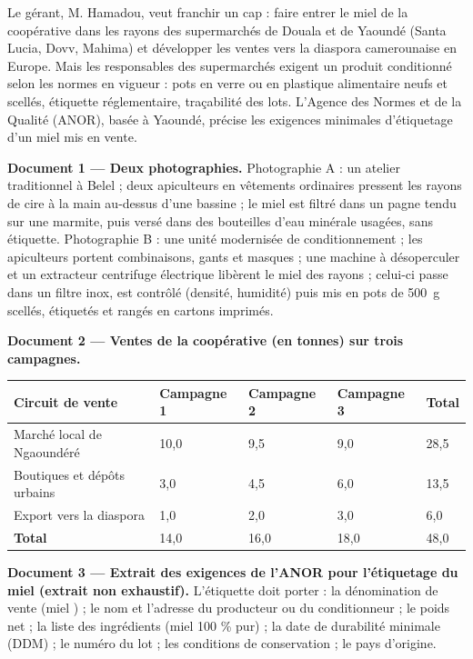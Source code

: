 \documentclass[11pt]{article}
\newcommand{\cle}[1]{{\popxbold\color{popdark}#1}}
\begin{document}
Le gérant, M. Hamadou, veut franchir un cap : faire entrer le miel de la coopérative dans les rayons des supermarchés de Douala et de Yaoundé (Santa Lucia, Dovv, Mahima) et développer les ventes vers la diaspora camerounaise en Europe. Mais les responsables des supermarchés exigent un produit \cle{conditionné} selon les \cle{normes} en vigueur : pots en verre ou en plastique alimentaire neufs et scellés, étiquette réglementaire, traçabilité des lots. L'Agence des Normes et de la Qualité (ANOR), basée à Yaoundé, précise les exigences minimales d'étiquetage d'un miel mis en vente.

\textbf{Document 1 — Deux photographies.} Photographie A : un atelier traditionnel à Belel ; deux apiculteurs en vêtements ordinaires pressent les rayons de cire à la main au-dessus d'une bassine ; le miel est filtré dans un pagne tendu sur une marmite, puis versé dans des bouteilles d'eau minérale usagées, sans étiquette. Photographie B : une unité modernisée de conditionnement ; les apiculteurs portent combinaisons, gants et masques ; une machine à désoperculer et un extracteur centrifuge électrique libèrent le miel des rayons ; celui-ci passe dans un filtre inox, est contrôlé (densité, humidité) puis mis en pots de \SI{500}{g} scellés, étiquetés et rangés en cartons imprimés.

\textbf{Document 2 — Ventes de la coopérative (en tonnes) sur trois campagnes.}

\begin{center}
\begin{tabularx}{\linewidth}{|l|X|X|X|X|}
\hline
\rowcolor{popblueL} \textbf{Circuit de vente} & \textbf{Campagne 1} & \textbf{Campagne 2} & \textbf{Campagne 3} & \textbf{Total} \\
\hline
Marché local de Ngaoundéré & 10,0 & 9,5 & 9,0 & 28,5 \\
\hline
Boutiques et dépôts urbains & 3,0 & 4,5 & 6,0 & 13,5 \\
\hline
Export vers la diaspora & 1,0 & 2,0 & 3,0 & 6,0 \\
\hline
\textbf{Total} & 14,0 & 16,0 & 18,0 & 48,0 \\
\hline
\end{tabularx}
\end{center}

\textbf{Document 3 — Extrait des exigences de l'ANOR pour l'étiquetage du miel (extrait non exhaustif).} L'étiquette doit porter : la dénomination de vente (\og miel \fg{}) ; le nom et l'adresse du producteur ou du conditionneur ; le poids net ; la liste des ingrédients (miel 100 \% pur) ; la date de durabilité minimale (DDM) ; le numéro du lot ; les conditions de conservation ; le pays d'origine.
\end{document}
